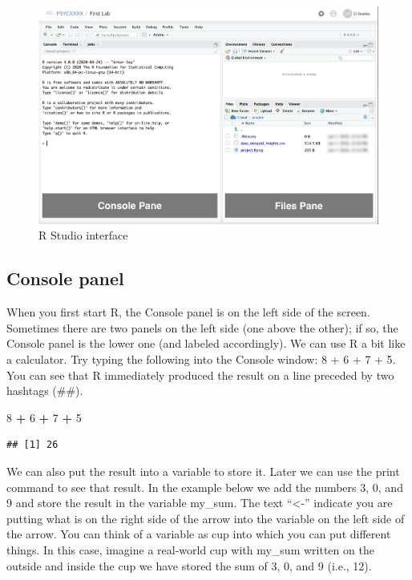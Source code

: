 \documentclass[
]{krantz}
\makeatletter
\newenvironment{Shaded}{\begin{snugshade}}{\end{snugshade}}
\newcommand{\DecValTok}[1]{\textcolor[rgb]{0.06,0.06,0.06}{#1}}
\newcommand{\OperatorTok}[1]{\textcolor[rgb]{0.43,0.43,0.43}{\textbf{#1}}}
\newcommand{\StringTok}[1]{\textcolor[rgb]{0.5,0.5,0.5}{#1}}
\newenvironment{kframe}{%
\medskip{}
\setlength{\fboxsep}{.8em}
 \def\at@end@of@kframe{}%
 \ifinner\ifhmode%
  \def\at@end@of@kframe{\end{minipage}}%
  \begin{minipage}{\columnwidth}%
 \fi\fi%
 \def\FrameCommand##1{\hskip\@totalleftmargin \hskip-\fboxsep
 \colorbox{shadecolor}{##1}\hskip-\fboxsep
     \hskip-\linewidth \hskip-\@totalleftmargin \hskip\columnwidth}%
 \MakeFramed {\advance\hsize-\width
   \@totalleftmargin\z@ \linewidth\hsize
   \@setminipage}}%
 {\par\unskip\endMakeFramed%
 \at@end@of@kframe}
\renewenvironment{Shaded}{\begin{kframe}}{\end{kframe}}
\makeatother
\begin{document}
\begin{figure}
\includegraphics[width=0.7\linewidth]{ch_introduction/images/screenshot_interface} \caption{R Studio interface}\label{fig:interface}
\end{figure}

\hypertarget{console-panel}{%
\subsection{Console panel}\label{console-panel}}

When you first start R, the Console panel is on the left side of the screen. Sometimes there are two panels on the left side (one above the other); if so, the Console panel is the lower one (and labeled accordingly). We can use R a bit like a calculator. Try typing the following into the Console window: 8 + 6 + 7 + 5. You can see that R immediately produced the result on a line preceded by two hashtags (\#\#).

\begin{Shaded}
\begin{Highlighting}[]
\DecValTok{8} \OperatorTok{+}\StringTok{ }\DecValTok{6} \OperatorTok{+}\StringTok{ }\DecValTok{7} \OperatorTok{+}\StringTok{ }\DecValTok{5}
\end{Highlighting}
\end{Shaded}

\begin{verbatim}
## [1] 26
\end{verbatim}

We can also put the result into a variable to store it. Later we can use the print command to see that result. In the example below we add the numbers 3, 0, and 9 and store the result in the variable my\_sum. The text ``\textless-'' indicate you are putting what is on the right side of the arrow into the variable on the left side of the arrow. You can think of a variable as cup into which you can put different things. In this case, imagine a real-world cup with my\_sum written on the outside and inside the cup we have stored the sum of 3, 0, and 9 (i.e., 12).
\end{document}
